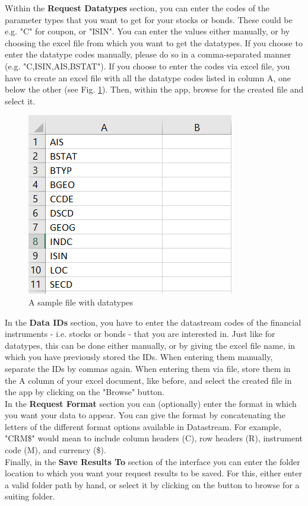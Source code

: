 Within the \textbf{Request Datatypes} section, you can enter the codes of the parameter types that you want to get for your stocks or bonds. These could be e.g. "C" for coupon, or "ISIN". You can enter the values either manually, or by choosing the excel file from which you want to get the datatypes. If you choose to enter the datatype codes manually, please do so in a comma-separated manner (e.g. "C,ISIN,AIS,BSTAT"). If you choose to enter the codes via excel file, you have to create an excel file with all the datatype codes listed in column A, one below the other (see Fig. \ref{fig:file-datatypes}). Then, within the app, browse for the created file and select it.

\begin{figure}[h]
	\centering
	\includegraphics[width=0.4\linewidth,height=0.35\linewidth]{figures/enter-datatypes.png}
	\caption{A sample file with datatypes}
	\label{fig:file-datatypes}
\end{figure}

In the \textbf{Data IDs} section, you have to enter the datastream codes of the financial instruments - i.e. stocks or bonds - that you are interested in. Just like for datatypes, this can be done either manually, or by giving the excel file name, in which you have previously stored the IDs. When entering them manually, separate the IDs by commas again. When entering them via file, store them in the A column of your excel document, like before, and select the created file in the app by clicking on the "Browse" button. \\

In the \textbf{Request Format} section you can (optionally) enter the format in which you want your data to appear. You can give the format by concatenating the letters of the different format options available in Datastream. For example, "CRM\$" would mean to include column headers (C), row headers (R), instrument code (M), and currency (\$). \\

Finally, in the \textbf{Save Results To} section of the interface you can enter the folder location to which you want your request results to be saved. For this, either enter a valid folder path by hand, or select it by clicking on the button to browse for a suiting folder. \\

